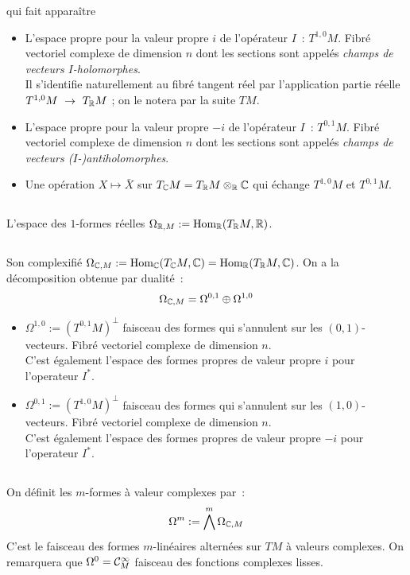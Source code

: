 \documentclass[a4paper,11pt,draft,makeidx,twocolumn]{amsart}
\begin{document}
qui fait apparaître
\begin{itemize}
\item L'espace propre pour la valeur propre $i$ de l'opérateur $I$~: $T^{1,0}M$. Fibré vectoriel complexe de dimension $n$ dont les sections sont appelés \textit{champs de vecteurs $I$-holomorphes}.\\
Il s'identifie naturellement au fibré tangent réel par l'application partie réelle $T^{1,0}M~\rightarrow~T_{\mathbb{R}} M$ ; on le notera par la suite $TM$.
\item L'espace propre pour la valeur propre $-i$ de l'opérateur $I$~: $T^{0,1}M$. Fibré vectoriel complexe de dimension $n$ dont les sections sont appelés \textit{champs de vecteurs \mbox{($I$-)antiholomorphes}}.
\item Une opération $X \mapsto \bar{X}$ sur $T_{\mathbb{C}} M = T_{\mathbb{R}} M \otimes_{\mathbb{R}} \mathbb{C}$ qui échange $T^{1,0}M$ et $T^{0,1}M$.
\end{itemize}
\subsection{} L'espace des $1$-formes réelles $\Omega_{\mathbb{R},M} := \text{Hom}_{\mathbb{R}}(T_{\mathbb{R}} M,\mathbb{R})$.
\subsection{} Son complexifié $\Omega_{\mathbb{C},M} := \text{Hom}_{\mathbb{C}}(T_{\mathbb{C}} M,\mathbb{C}) = \text{Hom}_{\mathbb{R}}(T_{\mathbb{R}} M,\mathbb{C})$. On a la décomposition obtenue par dualité~:
\[
\Omega_{\mathbb{C},M} = \Omega^{0,1} \oplus \Omega^{1,0}
\]
\begin{itemize}
\item $\Omega^{1,0} := (T^{0,1}M)^\bot$ faisceau des formes qui s'annulent sur les $(0,1)$-vecteurs. Fibré vectoriel complexe de dimension $n$.\\
C'est également l'espace des formes propres de valeur propre $i$ pour l'operateur $I^*$.
\item $\Omega^{0,1} := (T^{1,0}M)^\bot$ faisceau des formes qui s'annulent sur les $(1,0)$-vecteurs. Fibré vectoriel complexe de dimension $n$.\\
C'est également l'espace des formes propres de valeur propre $-i$ pour l'operateur $I^*$.
\end{itemize}
\subsection{} On définit les $m$-formes à valeur complexes par~:
\[
\Omega^m := \bigwedge^m \Omega_{\mathbb{C},M}
\]
C'est le faisceau des formes $m$-linéaires alternées sur $TM$ à valeurs complexes. On remarquera que $\Omega^0 = \mathcal{C}^\infty_M$ faisceau des fonctions complexes lisses.
\end{document}
